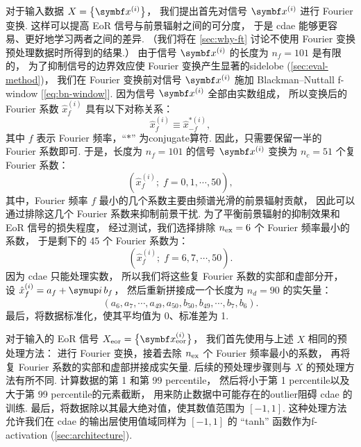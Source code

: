 对于输入数据 $X = \big\{ \B{x}^{(i)} \big\}$，
我们提出首先对信号 $\B{x}^{(i)}$ 进行 Fourier 变换.
这样可以提高 EoR 信号与前景辐射之间的可分度，
于是 \ac{cdae} 能够更容易、更好地学习两者之间的差异.
（我们将在 \autoref{sec:why-ft} 讨论不使用 Fourier 变换预处理数据时所得到的结果.）
由于信号 $\B{x}^{(i)}$ 的长度为 $n_f = 101$ 是有限的，
为了抑制信号的边界效应使 Fourier 变换产生显著的\ac{sidelobe}
(\autoref{sec:eval-method})，
我们在 Fourier 变换前对信号 $\B{x}^{(i)}$ 施加 Blackman--Nuttall \ac{f-window}
\cite{chapman2016} [\autoref{eq:bn-window}].
因为信号 $\B{x}^{(i)}$ 全部由实数组成，
所以变换后的 Fourier 系数 $\hat{x}^{(i)}_{f}$ 具有以下对称关系：
\begin{equation}
  \hat{x}^{(i)}_{f} \equiv \hat{x}^{*(i)}_{-f} ,
\end{equation}
其中 $f$ 表示 Fourier 频率，\enquote{$*$} 为\ac{conjugate}算符.
因此，只需要保留一半的 Fourier 系数即可.
于是，长度为 $n_f = 101$ 的信号 $\B{x}^{(i)}$ 变换为
$n_c = 51$ 个复 Fourier 系数：
\begin{equation}
  \left( \hat{x}^{(i)}_f; \; f = 0, 1, \cdots, 50 \right) ,
\end{equation}
其中，Fourier 频率 $f$ 最小的几个系数主要由频谱光滑的前景辐射贡献，
因此可以通过排除这几个 Fourier 系数来抑制前景干扰.
为了平衡前景辐射的抑制效果和 EoR 信号的损失程度，
经过测试，我们选择排除 $n_{\mathrm{ex}} = 6$ 个 Fourier 频率最小的系数，
于是剩下的 45 个 Fourier 系数为：
\begin{equation}
  \left( \hat{x}^{(i)}_f; \; f = 6, 7, \cdots, 50 \right) .
\end{equation}
因为 \ac{cdae} 只能处理实数，
所以我们将这些复 Fourier 系数的实部和虚部分开，
设 $\hat{x}^{(i)}_f = a_f + \Ci\,b_f$，
然后重新拼接成一个长度为 $n_d = 90$ 的实矢量：
\begin{equation}
  (a_6, a_7, \cdots, a_{49}, a_{50},
   b_{50}, b_{49}, \cdots, b_7, b_6) .
\end{equation}
最后，将数据标准化，使其平均值为 0、标准差为 1.

对于输入的 EoR 信号 $X_{\R{eor}} = \big\{ \B{x}^{(i)}_{\R{eor}} \big\}$，
我们首先使用与上述 $X$ 相同的预处理方法：
进行 Fourier 变换，接着去除 $n_{\mathrm{ex}}$ 个 Fourier 频率最小的系数，
再将复 Fourier 系数的实部和虚部拼接成实矢量.
后续的预处理步骤则与 $X$ 的预处理方法有所不同.
计算数据的第 1 和第 99 \ac{percentile}，
然后将小于第 1 \ac{percentile}以及大于第 99 \ac{percentile}的元素截断，
用来防止数据中可能存在的\ac{outlier}阻碍 \ac{cdae} 的训练.
最后，将数据除以其最大绝对值，使其数值范围为 $[-1, 1]$.
这种处理方法允许我们在 \ac{cdae} 的输出层使用值域同样为 $[-1, 1]$
的 \enquote{tanh} 函数作为\ac{f-activation} (\autoref{sec:architecture}).

